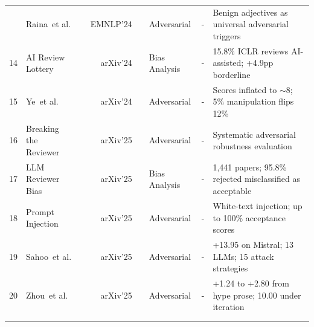 \documentclass{llmxive}
\providecommand{\etal}{et al.\xspace}
\begin{document}
\begin{table}[!ht]
{\begin{tabular}{c| >{\centering\arraybackslash}p{3cm} r r |c| >{\centering\arraybackslash}p{2.1cm} |c| p{7.8cm}}
\addlinespace[1pt]
{13} & Raina~\etal & \cite{raina2024adversarialjudge} & {\small EMNLP'24} & \href{https://arxiv.org/abs/2402.14016}{} & Adversarial      & -                                                                     & Benign adjectives as universal adversarial triggers \\
{14} & AI Review Lottery & \cite{ailottery2024} & {\small arXiv'24} & \href{https://arxiv.org/abs/2405.02150}{} & Bias Analysis    & -                                                                     & 15.8\% ICLR reviews AI-assisted; +4.9pp borderline \\
{15} & Ye~\etal & \cite{ye2024peerrisks} & {\small arXiv'24} & \href{https://arxiv.org/abs/2412.01708}{} & Adversarial      & -                                                                     & Scores inflated to $\sim$8; 5\% manipulation flips 12\% \\
{16} & Breaking the Reviewer & \cite{breakingreviewer2025} & {\small arXiv'25} & \href{https://arxiv.org/abs/2506.11113}{} & Adversarial     & -                                                                     & Systematic adversarial robustness evaluation \\
{17} & LLM Reviewer Bias & \cite{llmreviewer2025} & {\small arXiv'25} & \href{https://arxiv.org/abs/2509.09912}{} & Bias Analysis    & -                                                                     & 1,441 papers; 95.8\% rejected misclassified as acceptable \\
{18} & Prompt Injection & \cite{promptinjectionreview2025} & {\small arXiv'25} & \href{https://arxiv.org/abs/2509.10248}{} & Adversarial     & -                                                                     & White-text injection; up to 100\% acceptance scores \\
{19} & Sahoo~\etal & \cite{sahoo2025indirect} & {\small arXiv'25} & \href{https://arxiv.org/abs/2512.10449}{} & Adversarial      & -                                                                     & +13.95 on Mistral; 13 LLMs; 15 attack strategies \\
{20} & Zhou~\etal & \cite{zhou2025positiveprompt} & {\small arXiv'25} & \href{https://arxiv.org/abs/2511.01287}{} & Adversarial      & -                                                                     & +1.24 to +2.80 from hype prose; 10.00 under iteration \\
\addlinespace[3pt]
\multicolumn{8}{@{}l}{\cellcolor{S6color!65}\textbf{\textsf{~~Detection \& Policy}}} \\
\addlinespace[1pt]

\end{tabular}}
\end{table}
\end{document}
